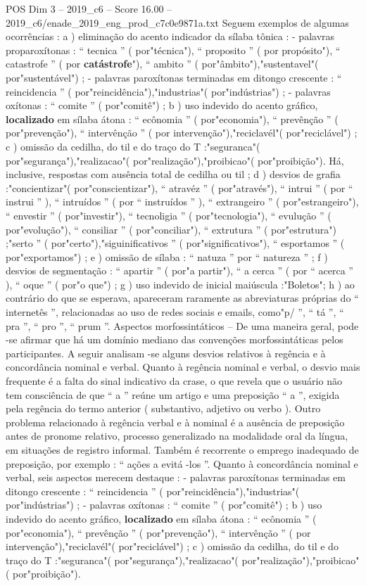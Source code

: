 \begin{textsample}{POS Dim 3 – 2019\_c6 – Score 16.00 – 2019\_c6/enade\_2019\_eng\_prod\_c7c0e9871a.txt}
Seguem exemplos de algumas ocorrências : a ) eliminação do acento indicador da sílaba tônica : - palavras proparoxítonas : “ tecnica ” ( por"técnica"), “ proposito ” ( por propósito"), “ catastrofe ” ( por \textbf{catástrofe}"), “ ambito ” ( por"âmbito"),"sustentavel"( por"sustentável") ; - palavras paroxítonas terminadas em ditongo crescente : “ reincidencia ” ( por"reincidência"),"industrias"( por"indústrias") ; - palavras oxítonas : “ comite ” ( por"comitê") ; b ) uso indevido do acento gráfico, \textbf{localizado} em sílaba átona : “ ecônomia ” ( por"economia"), “ prevênção ” ( por"prevenção"), “ intervênção ” ( por intervenção"),"reciclavél"( por"reciclável") ; c ) omissão da cedilha, do til e do traço do T :"seguranca"( por"segurança"),"realizacao"( por"realização"),"proibicao"( por"proibição").
Há, inclusive, respostas com ausência total de cedilha ou til ; d ) desvios de grafia :"concientizar"( por"conscientizar"), “ atravéz ” ( por"através"), “ intrui ” ( por “ instrui ” ), “ intruídos ” ( por “ instruídos ” ), “ extrangeiro ” ( por"estrangeiro"), “ envestir ” ( por"investir"), “ tecnoligia ” ( por"tecnologia"), “ evulução ” ( por"evolução"), “ consiliar ” ( por"conciliar"), “ extrutura ” ( por"estrutura") ;"serto ” ( por"certo"),"siguinificativos ” ( por"significativos"), “ esportamos ” ( por"exportamos") ; e ) omissão de sílaba : “ natuza ” por “ natureza ” ; f ) desvios de segmentação : “ apartir ” ( por"a partir"), “ a cerca ” ( por “ acerca ” ), “ oque ” ( por"o que") ; g ) uso indevido de inicial maiúscula :"Boletos"; h ) ao contrário do que se esperava, apareceram raramente as abreviaturas próprias do “ internetês ”, relacionadas ao uso de redes sociais e emails, como"p/ ”, “ tá ”, “ pra ”, “ pro ”, “ prum ”.
Aspectos morfossintáticos – De uma maneira geral, pode -se afirmar que há um domínio mediano das convenções morfossintáticas pelos participantes.
A seguir analisam -se alguns desvios relativos à regência e à concordância nominal e verbal.
Quanto à regência nominal e verbal, o desvio mais frequente é a falta do sinal indicativo da crase, o que revela que o usuário não tem consciência de que “ a ” reúne um artigo e uma preposição “ a ”, exigida pela regência do termo anterior ( substantivo, adjetivo ou verbo ).
Outro problema relacionado à regência verbal e à nominal é a ausência de preposição antes de pronome relativo, processo generalizado na modalidade oral da língua, em situações de registro informal.
Também é recorrente o emprego inadequado de preposição, por exemplo : “ ações a evitá -los ”.
Quanto à concordância nominal e verbal, seis aspectos merecem destaque : - palavras paroxítonas terminadas em ditongo crescente : “ reincidencia ” ( por"reincidência"),"industrias"( por"indústrias") ; - palavras oxítonas : “ comite ” ( por"comitê") ; b ) uso indevido do acento gráfico, \textbf{localizado} em sílaba átona : “ ecônomia ” ( por"economia"), “ prevênção ” ( por"prevenção"), “ intervênção ” ( por intervenção"),"reciclavél"( por"reciclável") ; c ) omissão da cedilha, do til e do traço do T :"seguranca"( por"segurança"),"realizacao"( por"realização"),"proibicao"( por"proibição").

\end{textsample}

